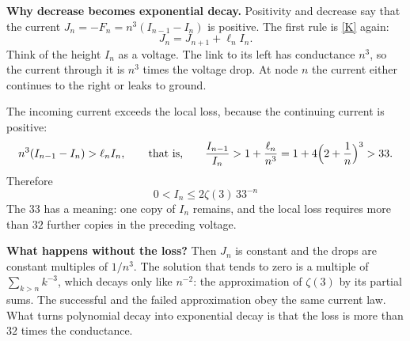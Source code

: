 \documentclass[11pt]{article}
\newcommand{\q}[1]{\medskip\noindent\textbf{#1}}
\begin{document}
\q{Why decrease becomes exponential decay.} Positivity and decrease say that the current
$J_n=-F_n=n^3(I_{n-1}-I_n)$ is positive. The first rule is \eqref{K} again:
\[
J_n=J_{n+1}+\ell_nI_n .
\]
Think of the height $I_n$ as a voltage. The link to its left has conductance $n^3$, so the current
through it is $n^3$ times the voltage drop. At node $n$ the current either continues to the right
or leaks to ground.
\begin{center}
\end{center}
The incoming current exceeds the local loss, because the continuing current is positive:
\[
n^3(I_{n-1}-I_n)>\ell_nI_n,\qquad\text{that is,}\qquad
\frac{I_{n-1}}{I_n}>1+\frac{\ell_n}{n^3}=1+4\Bigl(2+\frac1n\Bigr)^3>33 .
\]
Therefore
\begin{equation}\label{decay}
\boxed{\;0<I_n\le2\zeta(3)\,33^{-n}\;}
\end{equation}
The $33$ has a meaning: one copy of $I_n$ remains, and the local loss requires more than $32$
further copies in the preceding voltage.

\q{What happens without the loss?} Then $J_n$ is constant and the drops are constant multiples of
$1/n^3$. The solution that tends to zero is a multiple of $\sum_{k>n}k^{-3}$, which decays only like
$n^{-2}$: the approximation of $\zeta(3)$ by its partial sums. The successful and the failed
approximation obey the same current law. What turns polynomial decay into exponential decay is
that the loss is more than $32$ times the conductance.
\end{document}
